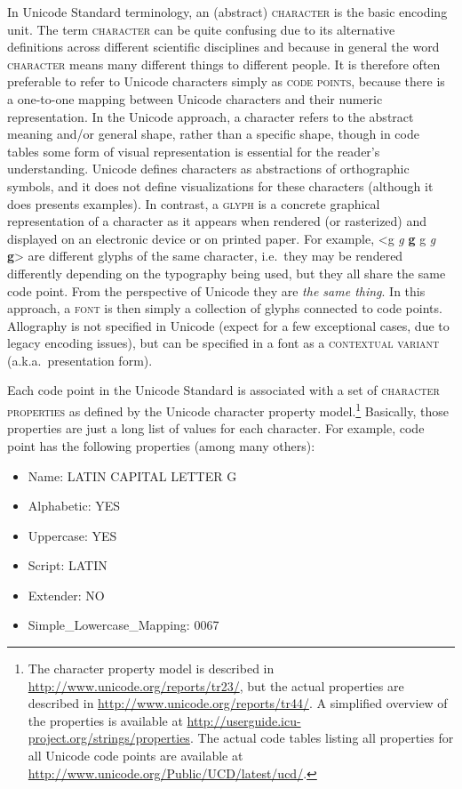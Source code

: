 In Unicode Standard terminology, an (abstract) \textsc{character} is the basic
encoding unit. The term \textsc{character} can be quite confusing due to its
alternative definitions across different scientific disciplines and because in
general the word \textsc{character} means many different things to different
people. It is therefore often preferable to refer to Unicode characters simply
as \textsc{code points}, because there is a one-to-one mapping between Unicode
characters and their numeric representation. In the Unicode approach, a
character refers to the abstract meaning and/or general shape, rather than a
specific shape, though in code tables some form of visual representation is
essential for the reader's understanding. Unicode defines characters as
abstractions of orthographic symbols, and it does not define visualizations for
these characters (although it does presents examples). In contrast, a
\textsc{glyph} is a concrete graphical representation of a character as it
appears when rendered (or rasterized) and displayed on an electronic device or
on printed paper. For example, <g {\large \textit{g}} \textbf{g}
{ {\small g} \textit{g} \textbf{g}}> are different glyphs of the
same character, i.e.~they may be rendered differently depending on the
typography being used, but they all share the same code point. From the
perspective of Unicode they are \textit{the same thing}. In this approach, a
\textsc{font} is then simply a collection of glyphs connected to code points.
Allography is not specified in Unicode (expect for a few exceptional cases, due
to legacy encoding issues), but can be specified in a font as a
\textsc{contextual variant} (a.k.a.~presentation form).

Each code point in the Unicode Standard is associated with a set of
\textsc{character properties} as defined by the Unicode character property
model.\footnote{The character property model is described in
\url{http://www.unicode.org/reports/tr23/}, but the actual properties are
described in \url{http://www.unicode.org/reports/tr44/}. A simplified overview
of the properties is available at
\url{http://userguide.icu-project.org/strings/properties}. The actual code
tables listing all properties for all Unicode code points are available at
\url{http://www.unicode.org/Public/UCD/latest/ucd/}.} Basically, those
properties are just a long list of values for each character. For example, code
point  has the following properties (among many others): 
\begin{itemize}
	\item Name: LATIN CAPITAL LETTER G 
	\item Alphabetic: YES 
	\item Uppercase: YES 
	\item Script: LATIN 
	\item Extender: NO 
	\item Simple\_Lowercase\_Mapping: 0067 
\end{itemize}

